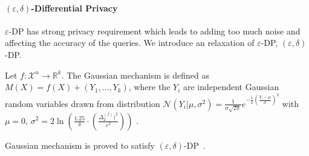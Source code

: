 


\paragraph{$\left(\varepsilon,\delta\right)$-Differential Privacy}
$\varepsilon$-DP has strong privacy requirement which leads to adding too much noise and affecting the accuracy of the queries. We introduce an relaxation of $\varepsilon$-DP, $\left(\varepsilon,\delta\right)$-DP.

\begin{definition}
    Let $f : \mathcal{X}^{n} \rightarrow \mathbb{R}^{k}$. The Gaussian mechanism is defined as $M\left( X\right) =f\left( X\right) +\left( Y_{1},\ldots ,Y_{k}\right) $, where the $Y_{i}$ are independent Gaussian random variables drawn from distribution $\mathcal{N}  \left(  Y_{i}| \mu ,\sigma ^{2}\right) =\frac{1}{\sigma \sqrt{2\pi }}e^{-\frac{1}{2}\left( \frac{Y_{i}-\mu}{\sigma }\right) ^{2}}$ with  $\mu=0$, $\sigma ^{2}=2\ln \left( \frac{1.25}{\delta }\cdot \left( \frac{ \Delta _{2}^{\left(f\right)}) ^{2}}{\varepsilon ^{2}}\right) \right)$ .
    \label{def:gaussianMechanism}
\end{definition}

Gaussian mechanism is proved to satisfy $\left(\varepsilon,\delta\right)$-DP~\cite{dwork2014algorithmic}.



